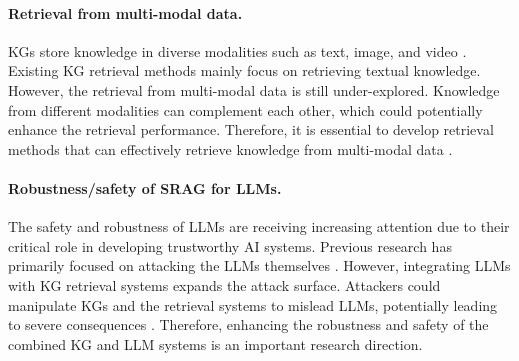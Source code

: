 \paragraph{Retrieval from multi-modal data.}
KGs store knowledge in diverse modalities such as text, image, and video \cite{zhu2022multi}. Existing KG retrieval methods mainly focus on retrieving textual knowledge. However, the retrieval from multi-modal data is still under-explored. Knowledge from different modalities can complement each other, which could potentially enhance the retrieval performance. Therefore, it is essential to develop retrieval methods that can effectively retrieve knowledge from multi-modal data \cite{long2024generative}.

\paragraph{Robustness/safety of SRAG for LLMs.} 
The safety and robustness of LLMs are receiving increasing attention due to their critical role in developing trustworthy AI systems. Previous research has primarily focused on attacking the LLMs themselves \cite{kumar2023certifying}. However, integrating LLMs with KG retrieval systems expands the attack surface. Attackers could manipulate KGs and the retrieval systems to mislead LLMs, potentially leading to severe consequences \cite{cheng2024trojanrag}. Therefore, enhancing the robustness and safety of the combined KG and LLM systems is an important research direction.

